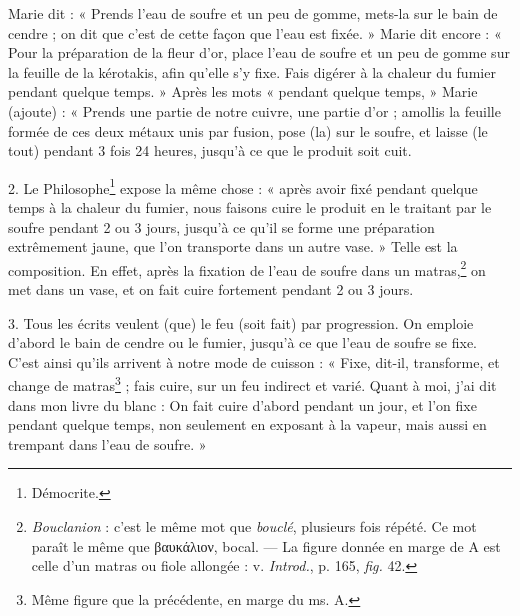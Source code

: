 \documentclass[landscape, a4paper, 11pt, oneside, polutonikogreek, french]{article}
\begin{document}
Marie dit : « Prends l'eau de soufre et un peu de gomme, mets-la sur le bain de cendre ; on dit que c'est de cette façon que l'eau est fixée. » Marie dit encore : « Pour la préparation de la fleur d'or, place l'eau de soufre et un peu de gomme sur la feuille de la kérotakis, afin qu'elle s'y fixe. Fais digérer à la chaleur du fumier pendant quelque temps. » Après les mots « pendant quelque temps, » Marie (ajoute) : « Prends une partie de notre cuivre, une partie d'or ; amollis la feuille formée de ces deux métaux unis par fusion, pose (la) sur le soufre, et laisse (le tout) pendant 3 fois 24 heures, jusqu'à ce que le produit soit cuit.

2. Le Philosophe\footnote{Démocrite.} expose la même chose : « après avoir fixé pendant quelque temps à la chaleur du fumier, nous faisons cuire le produit en le traitant par le soufre pendant 2 ou 3 jours, jusqu'à ce qu'il se forme une préparation extrêmement jaune, que l'on transporte dans un autre vase. » Telle est la composition. En effet, après la fixation de l'eau de soufre dans un matras,\footnote{\emph{Bouclanion} : c'est le même mot que \emph{bouclé}, plusieurs fois répété. Ce mot paraît le même que βαυκάλιον, bocal. --- La figure donnée en marge de A est celle d'un matras ou fiole allongée : v. \emph{Introd.}, p. 165, \emph{fig.} 42.} on met dans un vase, et on fait cuire fortement pendant 2 ou 3 jours.

3. Tous les écrits veulent (que) le feu (soit fait) par progression. On emploie d'abord le bain de cendre ou le fumier, jusqu'à ce que l'eau de soufre se fixe. C'est ainsi qu'ils arrivent à notre mode de cuisson : « Fixe, dit-il, transforme, et change de matras\footnote{Même figure que la précédente, en marge du ms. A.} ; fais cuire, sur un feu indirect et varié. Quant à moi, j'ai dit dans mon livre du blanc : On fait cuire d'abord pendant un jour, et l'on fixe pendant quelque temps, non seulement en exposant à la vapeur, mais aussi en trempant dans l'eau de soufre. »
\end{document}
